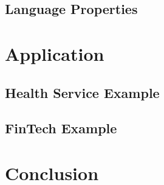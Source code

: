 \documentclass{llncs}
\begin{document}
\subsection{Language Properties}


\section{Application}


\subsection{Health Service Example}
\subsection{FinTech Example}


\section{Conclusion}





%

\end{document}
